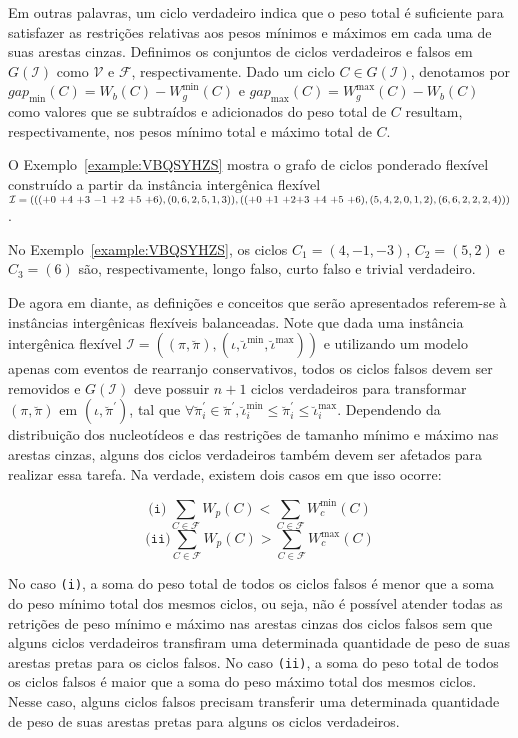 Em outras palavras, um ciclo verdadeiro indica que o peso total é suficiente para satisfazer as restrições relativas aos pesos mínimos e máximos em cada uma de suas arestas cinzas. Definimos os conjuntos de ciclos verdadeiros e falsos em $G(\mathcal{I})$ como $\mathcal{V}$ e $\mathcal{F}$, respectivamente. Dado um ciclo $C \in G(\mathcal{I})$, denotamos por $gap_{\min}(C) = W_b(C) - W^{\min}_g(C)$ e $gap_{\max}(C) = W^{\max}_g(C) - W_b(C)$ como valores que se subtraídos e adicionados do peso total de $C$ resultam, respectivamente, nos pesos mínimo total e máximo total de $C$.

O Exemplo~\ref{example:VBQSYHZS} mostra o grafo de ciclos ponderado flexível construído a partir da instância intergênica flexível $\mathcal{I} = ((({+0}~{+4}~{+3}~{-1}~{+2}~{+5}~{+6}),(0,6,2,5,1,3)),(({+0}~{+1}~{+2}\break{+3}~{+4}~{+5}~{+6}),(5,4,2,0,1,2),(6,6,2,2,2,4)))$.



No Exemplo~\ref{example:VBQSYHZS}, os ciclos $C_1=(4,-1,-3)$, $C_2 = (5,2)$ e $C_3 = (6)$ são, respectivamente, longo falso, curto falso e trivial verdadeiro.

De agora em diante, as definições e conceitos que serão apresentados referem-se à instâncias intergênicas flexíveis balanceadas. Note que dada uma instância intergênica flexível $\mathcal{I} = ((\pi,\breve\pi),(\iota,\breve\iota^{\min},\breve\iota^{\max}))$ e utilizando um modelo apenas com eventos de rearranjo conservativos, todos os ciclos falsos devem ser removidos e $G(\mathcal{I})$ deve possuir $n+1$ ciclos verdadeiros para transformar $(\pi,\breve\pi)$ em $(\iota,\breve\pi^{\prime})$, tal que $\forall \breve\pi^{\prime}_i \in \breve\pi^{\prime}, \breve\iota^{\min}_i \le \breve\pi^{\prime}_i \le \breve\iota^{\max}_i$. Dependendo da distribuição dos nucleotídeos e das restrições de tamanho mínimo e máximo nas arestas cinzas, alguns dos ciclos verdadeiros também devem ser afetados para realizar essa tarefa. Na verdade, existem dois casos em que isso ocorre:

$$\texttt{(i)}~\sum_{C \in \mathcal{F}} W_p(C) < \sum_{C \in \mathcal{F}} W^{\min}_c(C)$$
$$\texttt{(ii)}\sum_{C \in \mathcal{F}} W_p(C) > \sum_{C \in \mathcal{F}} W^{\max}_c(C)$$

No caso \texttt{(i)}, a soma do peso total de todos os ciclos falsos é menor que a soma do peso mínimo total dos mesmos ciclos, ou seja, não é possível atender todas as retrições de peso mínimo e máximo nas arestas cinzas dos ciclos falsos sem que alguns ciclos verdadeiros transfiram uma determinada quantidade de peso de suas arestas pretas para os ciclos falsos. No caso \texttt{(ii)}, a soma do peso total de todos os ciclos falsos é maior que a soma do peso máximo total dos mesmos ciclos. Nesse caso, alguns ciclos falsos precisam transferir uma determinada quantidade de peso de suas arestas pretas para alguns os ciclos verdadeiros.

